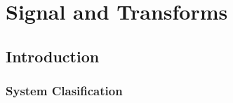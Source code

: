 %
%
%
%
%

\chapter{Signal and Transforms}

\newpage

\section{Introduction}
\subsection{System Clasification}

